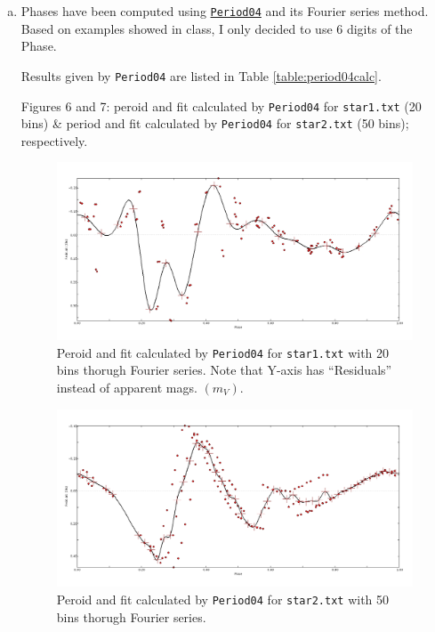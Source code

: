 \begin{enumerate} [a)]
\item Phases have been computed using \href{https://www.univie.ac.at/tops/Period04/}{\texttt{Period04}} and its Fourier series method. Based on examples showed in class, I only decided to use 6 digits of the Phase. 

Results given by \texttt{Period04} are listed in Table \ref{table:period04calc}.

Figures 6 and 7: peroid and fit calculated by \texttt{Period04} for \texttt{star1.txt} (20 bins)  \& period and fit calculated by \texttt{Period04} for \texttt{star2.txt} (50 bins); respectively.    

\begin{figure}[tb]
\centering
\includegraphics[width=\linewidth, clip]{star1txt_20bins.jpg}
\caption{Peroid and fit calculated by \texttt{Period04} for \texttt{star1.txt} with 20 bins thorugh Fourier series. Note that Y-axis has ``Residuals'' instead of apparent mags. $(m_V)$.}
\label{fig:F1}
\end{figure}

\begin{figure}[tb]
\centering
\includegraphics[width=\linewidth, clip]{star2txt_50bins.jpg}
\caption{Peroid and fit calculated by \texttt{Period04} for \texttt{star2.txt} with 50 bins thorugh Fourier series.}
\label{fig:F1}
\end{figure}


\end{enumerate}
